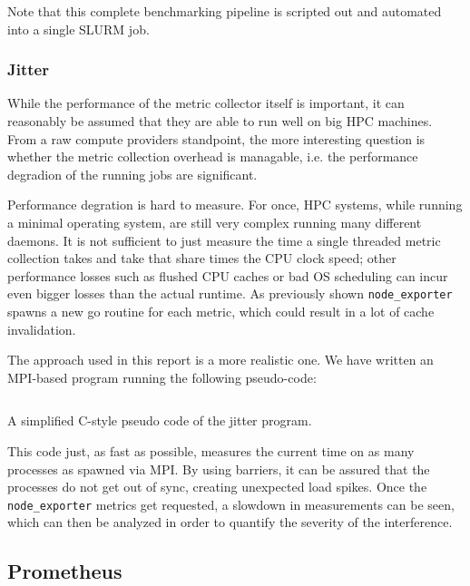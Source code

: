 Note that this complete benchmarking pipeline is scripted out and automated into a single SLURM job.
\subsubsection{Jitter}
While the performance of the metric collector itself is important, it can reasonably be assumed that they are able to run well on big \ac{HPC} machines. From a raw compute providers standpoint, the more interesting question is whether the metric collection overhead is managable, i.e. the performance degradion of the running jobs are significant. 

Performance degration is hard to measure. For once, \ac{HPC} systems, while running a minimal operating system, are still very complex running many different daemons. It is not sufficient to just measure the time a single threaded metric collection takes and take that share times the CPU clock speed; other performance losses such as flushed CPU caches or bad OS scheduling can incur even bigger losses than the actual runtime. As previously shown \texttt{node\_exporter} spawns a new go routine for each metric, which could result in a lot of cache invalidation.

The approach used in this report is a more realistic one. We have written an MPI-based program running the following pseudo-code:
\begin{listing}[H]
  \inputminted{C}{./jitter.c}
  \caption{A simplified C-style pseudo code of the jitter program.}
\end{listing}
This code just, as fast as possible, measures the current time on as many processes as spawned via MPI. By using barriers, it can be assured that the processes do not get out of sync, creating unexpected load spikes. Once the \texttt{node\_exporter} metrics get requested, a slowdown in measurements can be seen, which can then be analyzed in order to quantify the severity of the interference.

\subsection{Prometheus}


